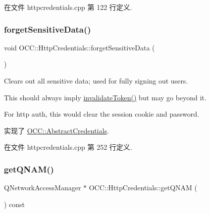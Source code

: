 在文件 httpcredentials.\+cpp 第 122 行定义.

\mbox{\label{class_o_c_c_1_1_http_credentials_a332002f8a742266ab26f7bc5eb1d4737}} 
\subsubsection{\texorpdfstring{forget\+Sensitive\+Data()}{forgetSensitiveData()}}
{\footnotesize\ttfamily void O\+C\+C\+::\+Http\+Credentials\+::forget\+Sensitive\+Data (\begin{DoxyParamCaption}{ }\end{DoxyParamCaption})\hspace{0.3cm}{\ttfamily [virtual]}}

Clears out all sensitive data; used for fully signing out users.

This should always imply \hyperlink{class_o_c_c_1_1_http_credentials_a1ea63d4fa2bb42a61ce3bfde3332c754}{invalidate\+Token()} but may go beyond it.

For http auth, this would clear the session cookie and password. 

实现了 \hyperlink{class_o_c_c_1_1_abstract_credentials_af8f5afe21813bd54607713342fef8448}{O\+C\+C\+::\+Abstract\+Credentials}.



在文件 httpcredentials.\+cpp 第 252 行定义.

\mbox{\label{class_o_c_c_1_1_http_credentials_ab35f0246f13eb9901a8d6a719db8046e}} 
\subsubsection{\texorpdfstring{get\+Q\+N\+A\+M()}{getQNAM()}}
{\footnotesize\ttfamily Q\+Network\+Access\+Manager $\ast$ O\+C\+C\+::\+Http\+Credentials\+::get\+Q\+N\+AM (\begin{DoxyParamCaption}{ }\end{DoxyParamCaption}) const\hspace{0.3cm}{\ttfamily [virtual]}}



